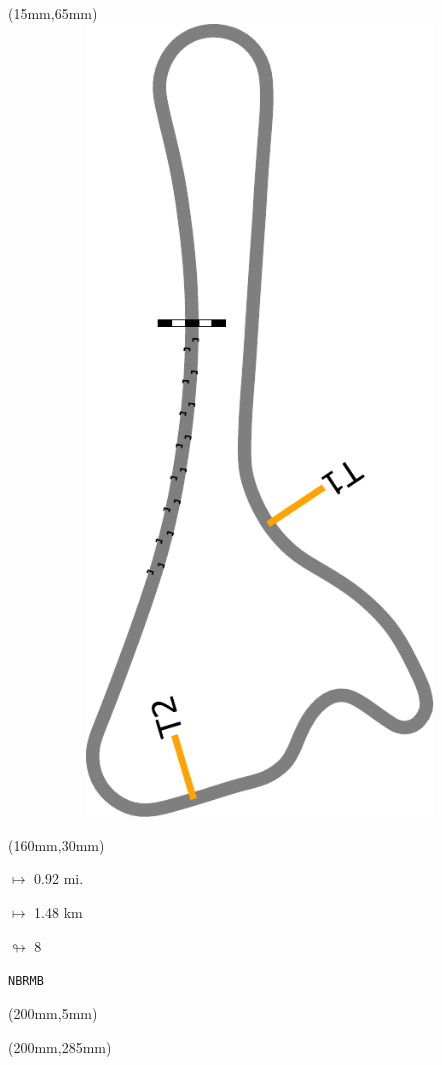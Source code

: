 \begin{textblock*}{185mm}(15mm,65mm)%
\centering
\mbox{\includegraphics[width=185mm,height=210mm,keepaspectratio]{PT/NBRMB.pdf}}
\end{textblock*}
\begin{textblock*}{40mm}(160mm,30mm)%
\Large
\par$\mapsto$ 0.92 mi.
\par$\mapsto$ 1.48 km
\par$\looparrowright$ 8
\par\hfill\tiny\tt NBRMB\\
\end{textblock*}
\begin{textblock*}{20mm}(200mm,5mm)%
\fbox{\thepage}
\label{NBRMB}
\end{textblock*}
\begin{textblock*}{20mm}(200mm,285mm)%
\fbox{\thepage}
\end{textblock*}

